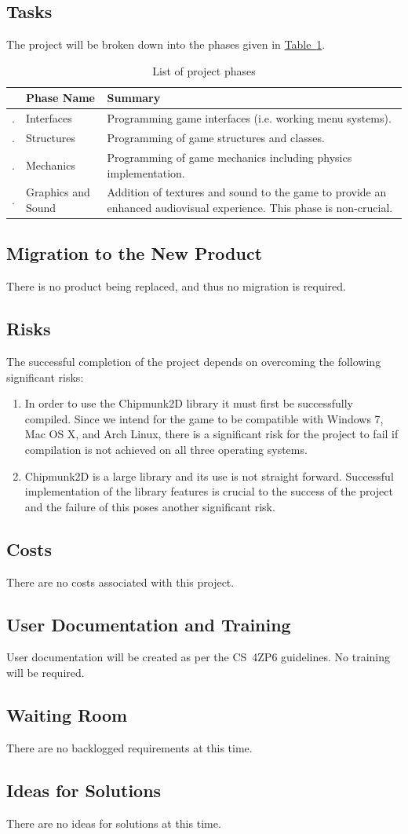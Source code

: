 \documentclass[12pt, titlepage]{article}
\newcounter{PhaseList}
\newcommand{\printPhase}{
    \stepcounter{PhaseList}
    \arabic{PhaseList}.
}
\begin{document}
\subsection{Tasks}
The project will be broken down into the phases given in \hyperref[tab:phases]{Table~\ref*{tab:phases}}.
\begin{table}[h]
\caption{List of project phases} \label{tab:phases}
\begin{tabularx}{\textwidth}{p{0.5cm}>{\raggedright}p{4.5cm}X}
\toprule & {\bf Phase Name} & {\bf Summary}\\
\midrule
\printPhase & Interfaces & Programming game interfaces (i.e. working menu systems).\\
\printPhase & Structures & Programming of game structures and classes.\\
\printPhase & Mechanics & Programming of game mechanics including physics implementation.\\
\printPhase & Graphics and Sound & Addition of textures and sound to the game to provide an enhanced audiovisual experience.  This phase is non-crucial. \\
\bottomrule
\end{tabularx}
\end{table}
\subsection{Migration to the New Product}
There is no product being replaced, and thus no migration is required.
\subsection{Risks}
The successful completion of the project depends on overcoming the following significant risks:
\begin{enumerate}
  \item In order to use the Chipmunk2D library it must first be successfully compiled.  Since we intend for the game to be compatible with Windows 7, Mac OS X, and Arch Linux, there is a significant risk for the project to fail if compilation is not achieved on all three operating systems.
  \item Chipmunk2D is a large library and its use is not straight forward.  Successful implementation of the library features is crucial to the success of the project and the failure of this poses another significant risk.
\end{enumerate}
\subsection{Costs}
There are no costs associated with this project.
\subsection{User Documentation and Training}
User documentation will be created as per the CS~4ZP6 guidelines.  No training will be required.
\subsection{Waiting Room}
There are no backlogged requirements at this time.
\subsection{Ideas for Solutions}
There are no ideas for solutions at this time.
\end{document}
